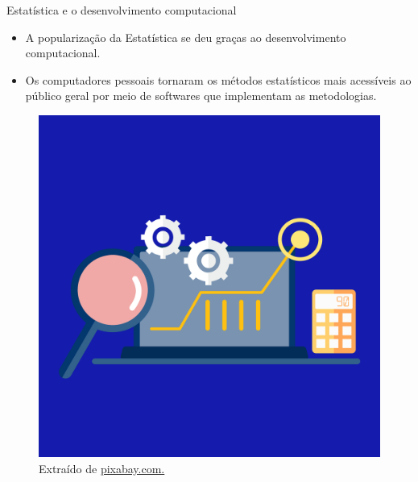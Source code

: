 \documentclass[
  ignorenonframetext,
  serif,
  professionalfont,
  usenames,
  dvipsnames,
  aspectratio = 169]{beamer}
\providecommand{\tightlist}{%
  \setlength{\itemsep}{0pt}\setlength{\parskip}{0pt}}
\renewcommand{\tightlist}{%
  \setlength{\itemsep}{0\baselineskip}
  \setlength{\parskip}{0.25\baselineskip}
}
\def\beginAHalfColumn{\begin{minipage}{0.49\textwidth}}%
\def\endColumns{\end{minipage}}%
\begin{document}
\begin{frame}{Estatística e o desenvolvimento computacional}
\label{estatuxedstica-e-o-desenvolvimento-computacional-1}
\beginAHalfColumn

\begin{itemize}
\tightlist
\item
  A popularização da Estatística se deu graças ao desenvolvimento
  computacional.
\end{itemize}

\vspace{0.3cm}

\begin{itemize}
\tightlist
\item
  Os computadores pessoais tornaram os métodos estatísticos mais
  acessíveis ao público geral por meio de softwares que implementam as
  metodologias.
\end{itemize}

\endColumns
\beginAHalfColumn

\begin{figure}

{\centering \includegraphics[width=0.6\linewidth]{./img/desenvolvimento-computacional} 

}

\caption{Extraído de \href{https://cdn.pixabay.com/photo/2020/04/04/04/23/graph-5000784_1280.png}{pixabay.com.}}\label{fig:unnamed-chunk-10}
\end{figure}

\endColumns
\end{frame}
\end{document}
